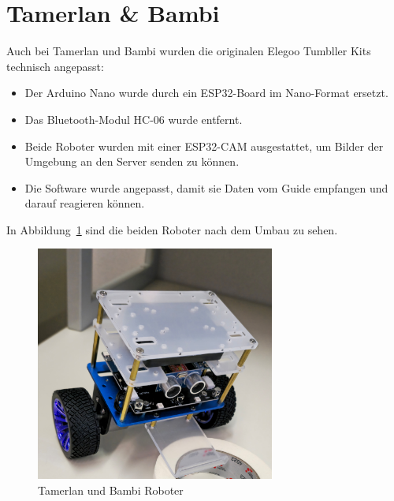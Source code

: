 \section{Tamerlan \& Bambi}
\label{subsec:hardware_tamerlan_bambi}

Auch bei Tamerlan und Bambi wurden die originalen Elegoo Tumbller Kits technisch angepasst:
\begin{itemize}
    \item Der Arduino Nano wurde durch ein ESP32-Board im Nano-Format ersetzt.
    \item Das Bluetooth-Modul HC-06 wurde entfernt.
    \item Beide Roboter wurden mit einer ESP32-CAM ausgestattet, um Bilder der Umgebung an den Server senden zu können.
    \item Die Software wurde angepasst, damit sie Daten vom Guide empfangen und darauf reagieren können.
\end{itemize}
In Abbildung~\ref{fig:tamerlan_bambi} sind die beiden Roboter nach dem Umbau zu sehen.
\begin{figure}[H]
    \centering
    \includegraphics[width=0.7\textwidth]{img/Hardware/tumbler.jpg}
   \caption{Tamerlan und Bambi Roboter}
    \label{fig:tamerlan_bambi}
\end{figure}